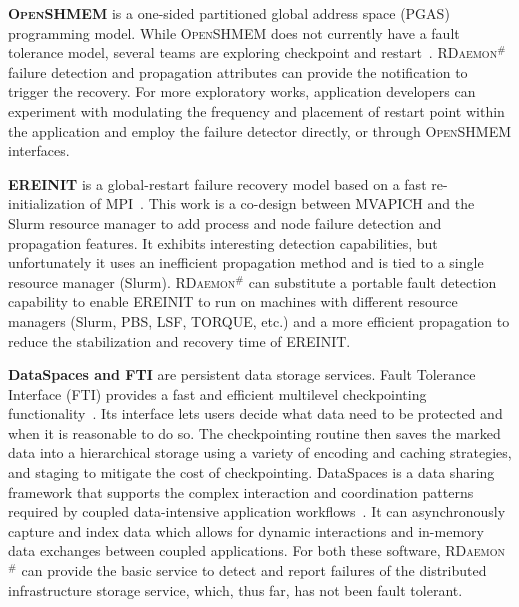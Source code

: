 \documentclass[5p,times,twocolumn]{elsarticle}
\newcommand{\mpi}[0]{\textsc{MPI}\xspace}
\newcommand{\oshmem}[0]{\textsc{OpenSHMEM}\xspace}
\newcommand{\ourwork}[0]{\textsc{RDaemon}\ensuremath{^\#}\xspace}
\begin{document}
\textbf{\oshmem} is a one-sided partitioned global address space (PGAS) programming model. While \oshmem does
not  currently have a fault tolerance model, several teams are exploring checkpoint and restart~\cite{shmem-ft15}.
\ourwork failure detection and propagation attributes can provide the
notification to trigger the recovery. For more exploratory works,
application developers can experiment with modulating the frequency and
 placement of restart point within the application and employ the
 failure detector directly, or through \oshmem interfaces.

\textbf{EREINIT} is a global-restart failure recovery model based
on a fast re-initialization of \mpi~\cite{reinit18}. This work is a co-design between MVAPICH and the Slurm resource manager to add process and node failure detection and propagation features.
It exhibits interesting detection capabilities, but unfortunately it uses an inefficient propagation method and is tied to a single resource manager (Slurm). \ourwork can substitute a portable fault detection capability to enable
EREINIT to run on machines with different resource managers (Slurm, PBS, LSF, TORQUE, etc.) and a more efficient propagation
to reduce the stabilization and recovery time of EREINIT.

\textbf{DataSpaces and FTI} are persistent data storage services.
Fault Tolerance Interface (FTI) provides a fast and efficient multilevel
checkpointing functionality~\cite{Bautista-Gomez:2011:FHP:2063384.2063427}. Its interface lets users decide what data need to be protected and when it is reasonable to do so. The
checkpointing routine then saves the marked data into a hierarchical storage using a variety of
encoding and caching strategies, and staging to mitigate the cost of checkpointing.
DataSpaces is a data sharing framework that supports the complex
interaction and coordination patterns required by coupled data-intensive application workflows~\cite{Sun:2016:IDP:3018814.3018816}.
It can asynchronously capture and index data  which allows for dynamic interactions and in-memory
data exchanges between coupled applications. For both these software, \ourwork can provide the basic service to
detect and report  failures of the distributed infrastructure storage service, which, thus far, has not been
fault tolerant.
\end{document}
